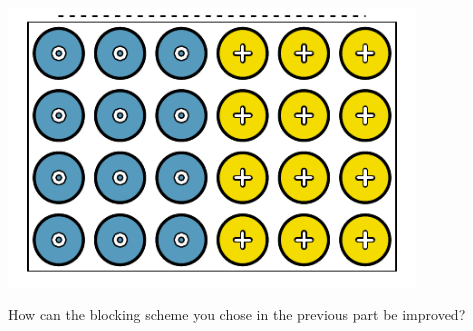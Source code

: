 {\begin{parts}
\begin{center}
\begin{minipage}[c]{0.35\textwidth}
\begin{center}
\includegraphics[width = 0.81\textwidth]{ch_data_collection/figures/eoce/cookies/cookiesB}
\end{center}
\end{minipage}
\end{center}
\item How can the blocking scheme you chose in the previous part be improved?
\end{parts}
}{}













